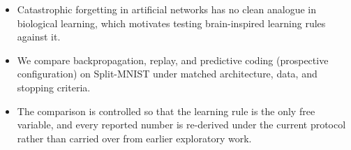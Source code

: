
\begin{itemize}
    \item Catastrophic forgetting in artificial networks has no clean analogue in biological learning, which motivates testing brain-inspired learning rules against it.
    \item We compare backpropagation, replay, and predictive coding (prospective configuration) on Split-MNIST under matched architecture, data, and stopping criteria.
    \item The comparison is controlled so that the learning rule is the only free variable, and every reported number is re-derived under the current protocol rather than carried over from earlier exploratory work.
\end{itemize}
